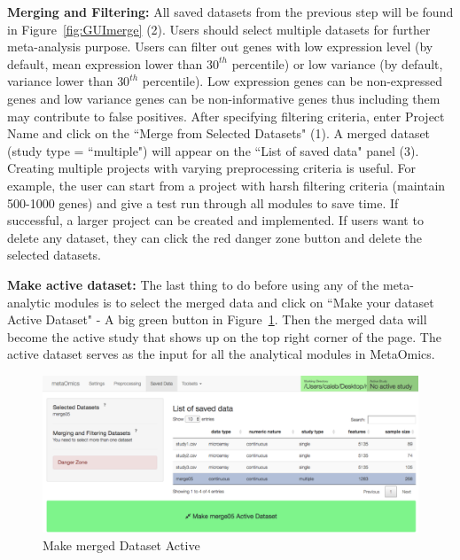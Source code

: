 \begin{steps}
\item \textbf{Merging and Filtering:}
All saved datasets from the previous step will be found in  Figure~\ref{fig:GUImerge} {\color{red} (2)}.
Users should select multiple datasets for further meta-analysis purpose.
Users can filter out genes with low expression level (by default, mean expression lower than $30^{th}$ percentile)
or low variance (by default, variance lower than $30^{th}$ percentile).
Low expression genes can be non-expressed genes and low variance genes can be non-informative genes thus including them may contribute to false positives.
After specifying filtering criteria, enter Project Name and click on the ``Merge from Selected Datasets" {\color{red} (1)}.
A merged dataset (study type = ``multiple") will appear on the ``List of saved data" panel {\color{red} (3)}.
Creating multiple projects with varying preprocessing criteria is useful.
For example, the user can start from a project with harsh filtering criteria (maintain 500-1000 genes) and give a test run through all modules to save time.
If successful, a larger project can be created and implemented.
If users want to delete any dataset, they can click the red danger zone button and delete the selected datasets.

\item \textbf{Make active dataset:}
\label{sec:active}
The last thing to do before using any of the meta-analytic modules is to select the merged data and click on 
``Make your dataset Active Dataset" - A big green button in Figure~\ref{fig:active}.
Then the merged data will become the active study that shows up on the top right corner of the page.
The active dataset serves as the input for all the analytical modules in MetaOmics.

\end{steps}







\begin{figure}[H]
\begin{center}
\includegraphics[scale=0.7]{./figure/preprocessing/GUImarkActive}
\caption{Make merged Dataset Active}
\label{fig:active}
\end{center}
\end{figure}




